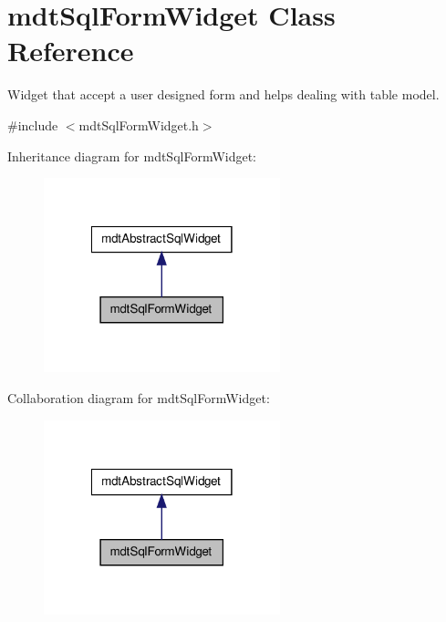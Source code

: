 \hypertarget{classmdt_sql_form_widget}{
\section{mdtSqlFormWidget Class Reference}
\label{classmdt_sql_form_widget}
}


Widget that accept a user designed form and helps dealing with table model.  




{\ttfamily \#include $<$mdtSqlFormWidget.h$>$}



Inheritance diagram for mdtSqlFormWidget:
\nopagebreak
\begin{figure}[H]
\begin{center}
\leavevmode
\includegraphics[width=194pt]{classmdt_sql_form_widget__inherit__graph}
\end{center}
\end{figure}


Collaboration diagram for mdtSqlFormWidget:
\nopagebreak
\begin{figure}[H]
\begin{center}
\leavevmode
\includegraphics[width=194pt]{classmdt_sql_form_widget__coll__graph}
\end{center}
\end{figure}
